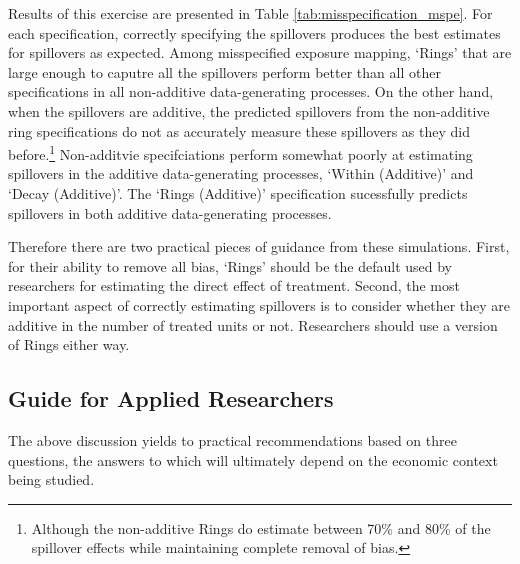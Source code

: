\documentclass[11pt]{article}
\begin{document}
Results of this exercise are presented in Table \ref{tab:misspecification_mspe}. For each specification, correctly specifying the spillovers produces the best estimates for spillovers as expected. Among misspecified exposure mapping, `Rings' that are large enough to caputre all the spillovers perform better than all other specifications in all non-additive data-generating processes. On the other hand, when the spillovers are additive, the predicted spillovers from the non-additive ring specifications do not as accurately measure these spillovers as they did before.\footnote{Although the non-additive Rings do estimate between 70\% and 80\% of the spillover effects while maintaining complete removal of bias.} Non-additvie specifciations perform somewhat poorly at estimating spillovers in the additive data-generating processes, `Within (Additive)' and `Decay (Additive)'. The `Rings (Additive)' specification sucessfully predicts spillovers in both additive data-generating processes. 

Therefore there are two practical pieces of guidance from these simulations. First, for their ability to remove all bias, `Rings' should be the default used by researchers for estimating the direct effect of treatment. Second, the most important aspect of correctly estimating spillovers is to consider whether they are additive in the number of treated units or not. Researchers should use a version of Rings either way.


\subsection{Guide for Applied Researchers}
\label{sec:parameterize}

The above discussion yields to practical recommendations based on three questions, the answers to which will ultimately depend on the economic context being studied. 
\end{document}
